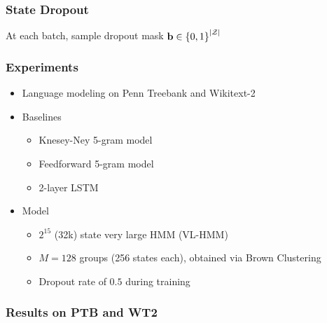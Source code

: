\documentclass{beamer}
\begin{document}
\begin{frame}
\frametitle{State Dropout}
At each batch, sample dropout mask $\mathbf{b} \in \left\{0,1\right\}^{|\mathcal{Z}|}$
\vspace{1em}
\begin{center}
\resizebox{0.75\width}{0.75\height}{

}
\end{center}
\end{frame}

\begin{frame}
\frametitle{Experiments}
\begin{itemize}
\item Language modeling on Penn Treebank and Wikitext-2
\item Baselines
    \begin{itemize}
    \item Knesey-Ney 5-gram model
    \item Feedforward 5-gram model
    \item 2-layer LSTM
    \end{itemize}
\item Model
    \begin{itemize}
    \item $2^{15}$ (32k) state very large HMM (VL-HMM)
    \item $M=128$ groups (256 states each), obtained via Brown Clustering
    \item Dropout rate of $0.5$ during training
    \end{itemize}
\end{itemize}
\end{frame}

\begin{frame}
\frametitle{Results on PTB and WT2}
\centering
{}
\end{frame}
\end{document}
